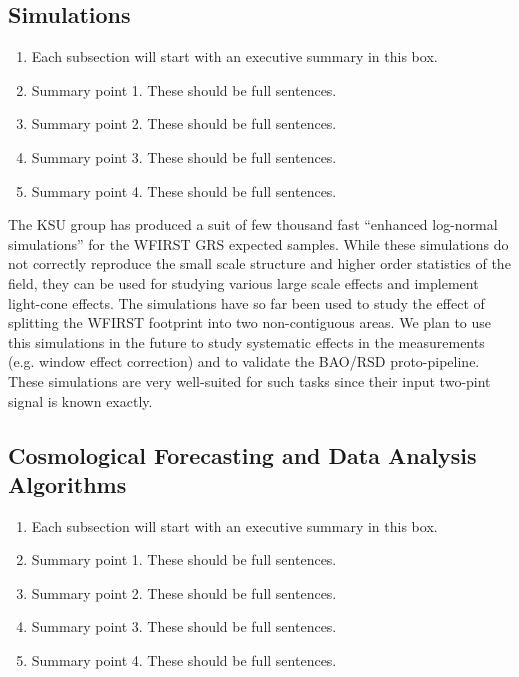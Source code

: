  \subsection{Simulations}

 \begin{summaryii}
 \begin{enumerate}
 \item Each subsection will start with an executive summary in this box.
 \item Summary point 1. These should be full sentences.
 \item Summary point 2. These should be full sentences.
 \item Summary point 3. These should be full sentences.
 \item Summary point 4. These should be full sentences.
 \end{enumerate}
 \end{summaryii}

 The KSU group has produced a suit of few thousand fast ``enhanced log-normal
 simulations'' for the WFIRST GRS expected samples. While these simulations do
 not correctly reproduce the small scale structure and higher order statistics of
 the field, they can be used for studying various large scale effects and
 implement light-cone effects. The simulations have so far been used to study the
 effect of splitting the WFIRST footprint into two non-contiguous areas. We plan
 to use this simulations in the future to study systematic effects in the
 measurements (e.g. window effect correction) and to validate the BAO/RSD
 proto-pipeline. These simulations are very well-suited for such tasks since
 their input two-pint signal is known exactly.

 \subsection{Cosmological Forecasting and Data Analysis Algorithms}

 \begin{summaryii}
 \begin{enumerate}
 \item Each subsection will start with an executive summary in this box.
 \item Summary point 1. These should be full sentences.
 \item Summary point 2. These should be full sentences.
 \item Summary point 3. These should be full sentences.
 \item Summary point 4. These should be full sentences.
 \end{enumerate}
 \end{summaryii}

